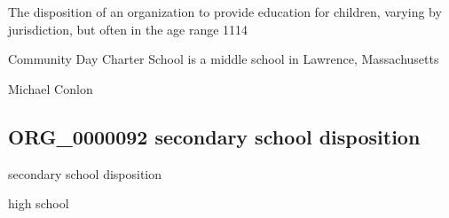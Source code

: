 \documentclass[letterpaper,10pt,english]{sphinxmanual}
\begin{document}
\begin{sphinxShadowBox}

\sphinxAtStartPar
The disposition of an organization to provide education for children, varying by jurisdiction, but often in the age range 11\sphinxhyphen{}14
\end{sphinxShadowBox}

\begin{sphinxShadowBox}

\sphinxAtStartPar
{}
\end{sphinxShadowBox}

\begin{sphinxShadowBox}

\sphinxAtStartPar
Community Day Charter School is a middle school in Lawrence, Massachusetts
\end{sphinxShadowBox}

\begin{sphinxShadowBox}

\sphinxAtStartPar
Michael Conlon 
\end{sphinxShadowBox}
\begin{quote}

\ignorespaces \end{quote}


\subsection{ORG\_0000092 \sphinxhyphen{} secondary school disposition}
\label{\detokenize{doc-ORG_0000092:org-0000092-secondary-school-disposition}}\label{\detokenize{doc-ORG_0000092:index-0}}\label{\detokenize{doc-ORG_0000092::doc}}
\begin{sphinxShadowBox}

\sphinxAtStartPar
secondary school disposition
\end{sphinxShadowBox}

\begin{sphinxShadowBox}

\sphinxAtStartPar
high school
\end{sphinxShadowBox}
\end{document}
